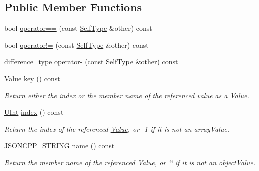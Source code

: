 \subsection*{Public Member Functions}
\begin{DoxyCompactItemize}
\item 
bool \hyperlink{classJson_1_1ValueIteratorBase_afc656672ac28502f640ade32c38c1b56}{operator==} (const \hyperlink{classJson_1_1ValueIteratorBase_a9d2a940d03ea06d20d972f41a89149ee}{Self\+Type} \&other) const 
\item 
bool \hyperlink{classJson_1_1ValueIteratorBase_a18c2dd42e0bb989ace141bfe9de52792}{operator!=} (const \hyperlink{classJson_1_1ValueIteratorBase_a9d2a940d03ea06d20d972f41a89149ee}{Self\+Type} \&other) const 
\item 
\hyperlink{classJson_1_1ValueIteratorBase_a4e44bf8cbd17ec8d6e2c185904a15ebd}{difference\+\_\+type} \hyperlink{classJson_1_1ValueIteratorBase_ab786787fcad68ca5e8745aaf520fa17f}{operator-\/} (const \hyperlink{classJson_1_1ValueIteratorBase_a9d2a940d03ea06d20d972f41a89149ee}{Self\+Type} \&other) const 
\item 
\hyperlink{classJson_1_1Value}{Value} \hyperlink{classJson_1_1ValueIteratorBase_aa2ff5e79fc96acd4c3cd288e92614fc7}{key} () const 
\begin{DoxyCompactList}\small\item\em Return either the index or the member name of the referenced value as a \hyperlink{classJson_1_1Value}{Value}. \end{DoxyCompactList}\item 
\hyperlink{namespaceJson_a800fb90eb6ee8d5d62b600c06f87f7d4}{U\+Int} \hyperlink{classJson_1_1ValueIteratorBase_aa90591f5f7f8d2f06cc4605816b53738}{index} () const 
\begin{DoxyCompactList}\small\item\em Return the index of the referenced \hyperlink{classJson_1_1Value}{Value}, or -\/1 if it is not an array\+Value. \end{DoxyCompactList}\item 
\hyperlink{json_8hpp_a1e723f95759de062585bc4a8fd3fa4be}{J\+S\+O\+N\+C\+P\+P\+\_\+\+S\+T\+R\+I\+NG} \hyperlink{classJson_1_1ValueIteratorBase_a99026427eb156ce007ef94df002e233f}{name} () const 
\begin{DoxyCompactList}\small\item\em Return the member name of the referenced \hyperlink{classJson_1_1Value}{Value}, or \char`\"{}\char`\"{} if it is not an object\+Value. \end{DoxyCompactList}\item 

\end{DoxyCompactItemize}
